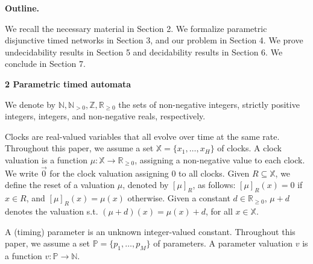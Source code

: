 
 
 
\par\medskip\noindent\textbf{Outline.}\par
 
 
We recall the necessary material in Section 2. We formalize parametric disjunctive timed networks in Section 3, and our problem in Section 4. We prove undecidability results in Section 5 and decidability results in Section 6. We conclude in Section 7.\par
 
 
 
 


 
\par\medskip\noindent\textbf{2 Parametric timed automata}\par
 
 
We denote by $\mathbb{N},\mathbb{N}_{>0},\mathbb{Z},\mathbb{R}_{\geq 0}$ the sets of non-negative integers, strictly positive integers, integers, and non-negative reals, respectively.\par
 
 
 
Clocks are real-valued variables that all evolve over time at the same rate. Throughout this paper, we assume a set $\mathbb{X}=\{x_{1},\dots,x_{H}\}$ of clocks. A clock valuation is a function $\mu:\mathbb{X}\to\mathbb{R}_{\geq 0}$, assigning a non-negative value to each clock. We write $\vec{0}$ for the clock valuation assigning $0$ to all clocks. Given $R\subseteq\mathbb{X}$, we define the reset of a valuation $\mu$, denoted by $[\mu]_{R}$, as follows: $[\mu]_{R}(x)=0$ if $x\in R$, and $[\mu]_{R}(x)=\mu(x)$ otherwise. Given a constant $d\in\mathbb{R}_{\geq 0}$, $\mu+d$ denotes the valuation s.t. $(\mu+d)(x)=\mu(x)+d$, for all $x\in\mathbb{X}$.\par
 
 
 
A (timing) parameter is an unknown integer-valued constant. Throughout this paper, we assume a set $\mathbb{P}=\{p_{1},\dots,p_{M}\}$ of parameters. A parameter valuation $v$ is a function $v:\mathbb{P}\to\mathbb{N}$.\par
 
